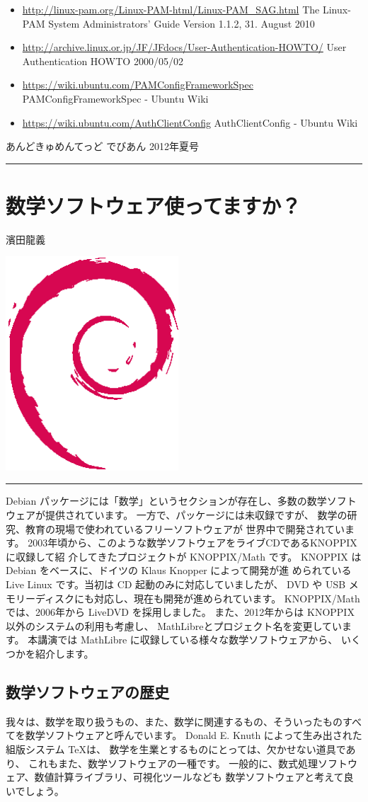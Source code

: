 \documentclass[mingoth,a4paper]{jsarticle}
\renewcommand{\dancersection}[2]{%
\newpage
あんどきゅめんてっど でびあん 2012年夏号
%
\vspace{0.1mm}\\
{\color{dancerdarkblue}\rule{\hsize}{2mm}}

%
%
\begin{minipage}[t]{0.6\hsize}
\color{dancerdarkblue}
\vspace{1cm}
\section{#1}
\hfill{}#2\\
\end{minipage}
\begin{minipage}[t]{0.4\hsize}
\vspace{-2cm}
\hfill{}\includegraphics[height=8cm]{image200502/openlogo-nd.eps}\\
\vspace{-5cm}
\end{minipage}
%
{\color{dancerlightblue}\rule{0.66\hsize}{2mm}}
%
\vspace{2cm}
}
\begin{document}
\begin{itemize}
\item \href{http://linux-pam.org/Linux-PAM-html/Linux-PAM_SAG.html}{http://linux-pam.org/Linux-PAM-html/Linux-PAM\_SAG.html} The Linux-PAM System Administrators' Guide Version 1.1.2, 31. August 2010
\item \href{http://archive.linux.or.jp/JF/JFdocs/User-Authentication-HOWTO/}{http://archive.linux.or.jp/JF/JFdocs/User-Authentication-HOWTO/} User Authentication HOWTO 2000/05/02
\item \href{https://wiki.ubuntu.com/PAMConfigFrameworkSpec}{https://wiki.ubuntu.com/PAMConfigFrameworkSpec} PAMConfigFrameworkSpec - Ubuntu Wiki
\item \href{https://wiki.ubuntu.com/AuthClientConfig}{https://wiki.ubuntu.com/AuthClientConfig} AuthClientConfig - Ubuntu Wiki
\end{itemize}


\dancersection{数学ソフトウェア使ってますか？}{濱田龍義}
\label{sec:MathLibre}

\vspace{2em}

Debian パッケージには「数学」というセクションが存在し、多数の数学ソフト
ウェアが提供されています。 一方で、パッケージには未収録ですが、
数学の研究、教育の現場で使われているフリーソフトウェアが
世界中で開発されています。
2003年頃から、このような数学ソフトウェアをライブCDであるKNOPPIX に収録して紹
介してきたプロジェクトが KNOPPIX/Math です。
KNOPPIX は Debian をベースに、ドイツの Klaus Knopper によって開発が進
められている Live Linux です。当初は CD 起動のみに対応していましたが、
DVD や USB メモリーディスクにも対応し、現在も開発が進められています。
KNOPPIX/Math では、2006年から LiveDVD を採用しました。
また、2012年からは KNOPPIX 以外のシステムの利用も考慮し、
MathLibreとプロジェクト名を変更しています。
本講演では MathLibre に収録している様々な数学ソフトウェアから、
いくつかを紹介します。

\subsection{数学ソフトウェアの歴史}
我々は、数学を取り扱うもの、また、数学に関連するもの、そういったものすべ
てを数学ソフトウェアと呼んでいます。
Donald E. Knuth によって生み出された組版システム \TeX{}は、
数学を生業とするものにとっては、欠かせない道具であり、
これもまた、数学ソフトウェアの一種です。
一般的に、数式処理ソフトウェア、数値計算ライブラリ、可視化ツールなども
数学ソフトウェアと考えて良いでしょう。
\end{document}

